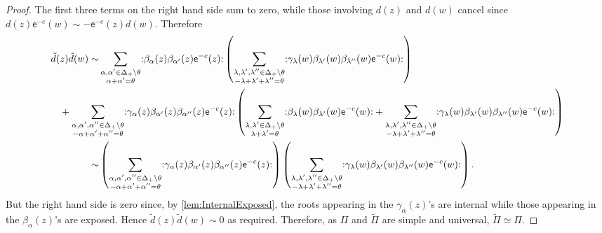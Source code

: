 \documentclass[10pt,a4paper]{amsart}
\numberwithin{equation}{section}
\renewcommand{\cong}{\simeq} %
\newcommand{\ee}{\mathsf{e}}   %
\newcommand{\no}[1]{\mathopen{:} #1 \mathclose{:}} %
\newcommand{\proots}{\Delta_+}                                       %
\newcommand{\hroot}{\theta}                                          %
\theoremstyle{plain}
\begin{document}
\begin{proof}
    The first three terms on the right hand side sum to zero, while those involving $d(z)$ and $d(w)$ cancel since $d(z) \ee^{-c}(w) \sim -\ee^{-c}(z)d(w)$. Therefore
    \begin{align} \label{eq:ddOPE}
        \tilde{d}(z)\tilde{d}(w) \sim& \sum_{\substack{\alpha,\alpha' \in \proots \setminus \hroot \\ \alpha+\alpha'=\hroot}} \no{\beta_\alpha (z) \beta_{\alpha'}(z)\ee^{-c}(z)} 
        \left(\sum_{\substack{\lambda,\lambda',\lambda'' \in \proots \setminus \hroot \\ -\lambda+\lambda'+\lambda''=\hroot}} \no{\gamma_\lambda(w) \beta_{\lambda'} (w) \beta_{\lambda''}(w)\ee^{-c}(w)}\right) \notag \\
        &\hspace{-4em}+  \sum_{\substack{\alpha,\alpha',\alpha'' \in \proots \setminus \hroot \\ -\alpha+\alpha'+\alpha''=\hroot}} \no{\gamma_\alpha(z) \beta_{\alpha'} (z) \beta_{\alpha''}(z)\ee^{-c}(z)} 
        \left( \sum_{\substack{\lambda,\lambda' \in \proots \setminus \hroot \\ \lambda+\lambda'=\hroot}} \no{\beta_\lambda (w) \beta_{\lambda'}(w)\ee^{-c}(w)} 
        +\sum_{\substack{\lambda,\lambda',\lambda'' \in \proots \setminus \hroot \\ -\lambda+\lambda'+\lambda''=\hroot}} \no{\gamma_\lambda(w) \beta_{\lambda'} (w) \beta_{\lambda''}(w)\ee^{-c}(w)}\right) \notag \\
        \sim& \left( \sum_{\substack{\alpha,\alpha',\alpha'' \in \proots \setminus \hroot \\ -\alpha+\alpha'+\alpha''=\hroot}} \no{\gamma_\alpha(z) \beta_{\alpha'} (z) \beta_{\alpha''}(z)\ee^{-c}(z)} \right) 
        \left(\sum_{\substack{\lambda,\lambda',\lambda'' \in \proots \setminus \hroot \\ -\lambda+\lambda'+\lambda''=\hroot}} \no{\gamma_\lambda(w) \beta_{\lambda'} (w) \beta_{\lambda''}(w)\ee^{-c}(w)}\right). \notag 
    \end{align}
    But the right hand side is zero since, by \cref{lem:InternalExposed}, the roots appearing in the $\gamma_\alpha(z)$'s are internal while those appearing in the $\beta_\alpha(z)$'s are exposed. Hence $\tilde{d}(z)\tilde{d}(w) \sim 0$ as required. Therefore, as $\Pi$ and $\widetilde{\Pi}$ are simple and universal, $\widetilde{\Pi} \cong \Pi$.
\end{proof}
\end{document}
